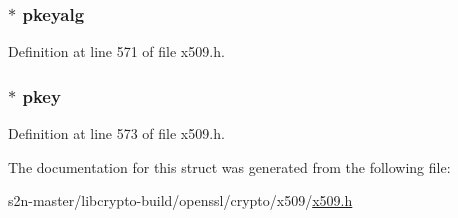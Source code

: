 \subsubsection[{\texorpdfstring{pkeyalg}{pkeyalg}}]{ $\ast$ pkeyalg}\hypertarget{structpkcs8__priv__key__info__st_a9f92aa2c457fb00f0eee3c110d475bfc}{}\label{structpkcs8__priv__key__info__st_a9f92aa2c457fb00f0eee3c110d475bfc}


Definition at line 571 of file x509.\+h.

\subsubsection[{\texorpdfstring{pkey}{pkey}}]{ $\ast$ pkey}\hypertarget{structpkcs8__priv__key__info__st_a0e3690a1fc8714ea2d4c3906eed9007f}{}\label{structpkcs8__priv__key__info__st_a0e3690a1fc8714ea2d4c3906eed9007f}


Definition at line 573 of file x509.\+h.



The documentation for this struct was generated from the following file\+:\begin{DoxyCompactItemize}
\item 
s2n-\/master/libcrypto-\/build/openssl/crypto/x509/\hyperlink{crypto_2x509_2x509_8h}{x509.\+h}\end{DoxyCompactItemize}
